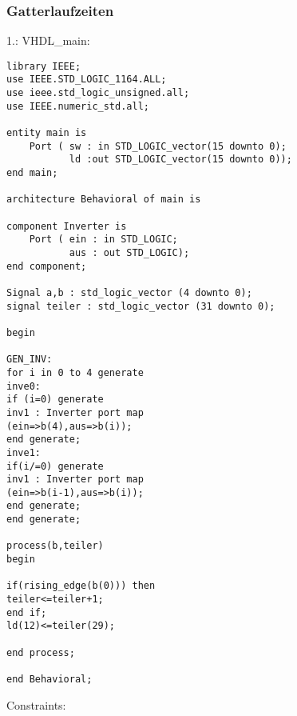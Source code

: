 \documentclass{article}
\begin{document}
\subsubsection{Gatterlaufzeiten}
1.:\newline
VHDL\_main:\newline
\begin{verbatim}
library IEEE;
use IEEE.STD_LOGIC_1164.ALL;
use ieee.std_logic_unsigned.all;
use IEEE.numeric_std.all;

entity main is
    Port ( sw : in STD_LOGIC_vector(15 downto 0);
           ld :out STD_LOGIC_vector(15 downto 0));
end main;

architecture Behavioral of main is

component Inverter is
    Port ( ein : in STD_LOGIC;
           aus : out STD_LOGIC);
end component;

Signal a,b : std_logic_vector (4 downto 0);
signal teiler : std_logic_vector (31 downto 0);

begin

GEN_INV:
for i in 0 to 4 generate
inve0:
if (i=0) generate
inv1 : Inverter port map
(ein=>b(4),aus=>b(i));
end generate;
inve1:
if(i/=0) generate
inv1 : Inverter port map
(ein=>b(i-1),aus=>b(i));
end generate;
end generate;

process(b,teiler)
begin

if(rising_edge(b(0))) then
teiler<=teiler+1;
end if;
ld(12)<=teiler(29);

end process;

end Behavioral;
\end{verbatim}
Constraints:\newline
\end{document}
